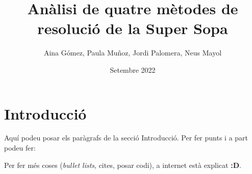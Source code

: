 \documentclass{article}
\title{Anàlisi de quatre mètodes de resolució de la Super Sopa}
\author{Aina Gómez, Paula Muñoz, Jordi Palomera, Neus Mayol}
\date{Setembre 2022}
\begin{document}
\maketitle

\section{Introducció}
Aquí podeu posar els paràgrafs de la secció Introducció. Per fer punts i a part podeu fer:
\newline \par

Per fer més coses (\emph{bullet lists}, cites, posar codi), a internet està explicat \textbf{:D}.
\end{document}
